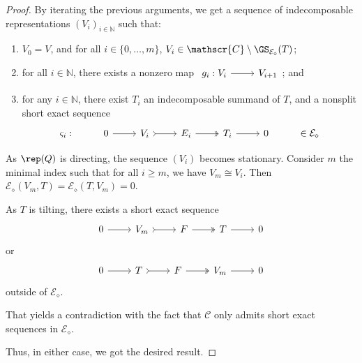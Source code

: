 \begin{proof}
By iterating the previous arguments, we get a sequence of indecomposable representations $(V_i)_{i \in \mathbb{N}}$ such that:
\begin{enumerate}[label=$\bullet$, itemsep=1mm]
    \item $V_0 = V$, and for all $i \in \{0,\ldots,m\}$,  $V_i \in \mathscr{C} \setminus \GS_{\mathcal{E}_\diamond}(T)$;
    \item for all $i \in \mathbb{N}$, there exists a nonzero map $\begin{tikzcd}
        g_i : V_i & V_{i+1} 
	\arrow[from=1-1, to=1-2]
\end{tikzcd}$; and
    \item  for any $i \in \mathbb{N}$, there exist $T_i$ an indecomposable summand of $T$, and a nonsplit short exact sequence \[\begin{tikzcd}
	 \varsigma_i : & 0 & V_i & E_i & T_i &  0 & \in \mathcal{E}_\diamond
	\arrow[from=1-2, to=1-3]
	\arrow[tail, from=1-3, to=1-4]
	\arrow[two heads,from=1-4, to=1-5]
	\arrow[from=1-5, to=1-6]
\end{tikzcd}\]
\end{enumerate}

As $\rep(Q)$ is directing, the sequence $(V_i)$ becomes stationary. Consider $m$ the minimal index such that for all $i \geqslant m$, we have $V_m \cong V_i$. Then $\mathcal{E}_\diamond(V_m,T) = \mathcal{E}_\diamond(T,V_m) = 0$.

As $T$ is tilting, there exists a short exact sequence 
\[\begin{tikzcd}
	 0 & V_m & F & T &  0 
	\arrow[from=1-1, to=1-2]
	\arrow[tail, from=1-2, to=1-3]
	\arrow[two heads,from=1-3, to=1-4]
	\arrow[from=1-4, to=1-5]
\end{tikzcd}\] or \[\begin{tikzcd}
	 0 & T & F & V_m &  0 
	\arrow[from=1-1, to=1-2]
	\arrow[tail, from=1-2, to=1-3]
	\arrow[two heads,from=1-3, to=1-4]
	\arrow[from=1-4, to=1-5]
\end{tikzcd}\] outside of $\mathcal{E}_\diamond$.

That yields a contradiction with the fact that $\mathscr{C}$ only admits short exact sequences in $\mathcal{E}_\diamond$.

Thus, in either case, we got the desired result.
\end{proof}

